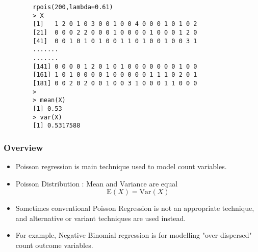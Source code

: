 \documentclass[MASTER.tex]{subfiles}
\begin{document}
\begin{frame}[fragile]
	\begin{framed}
		\begin{verbatim}
		rpois(200,lambda=0.61)
		> X
		[1]   1 2 0 1 0 3 0 0 1 0 0 4 0 0 0 1 0 1 0 2
		[21]  0 0 0 2 2 0 0 0 1 0 0 0 0 1 0 0 0 1 2 0
		[41]  0 0 1 0 1 0 1 0 0 1 1 0 1 0 0 1 0 0 3 1
		.......
		.......
		[141] 0 0 0 0 1 2 0 1 0 1 0 0 0 0 0 0 0 1 0 0
		[161] 1 0 1 0 0 0 0 1 0 0 0 0 0 1 1 1 0 2 0 1
		[181] 0 0 2 0 2 0 0 1 0 0 3 1 0 0 0 1 1 0 0 0
		>
		> mean(X)
		[1] 0.53
		> var(X)
		[1] 0.5317588
		\end{verbatim}
	\end{framed}
\end{frame}
\begin{frame}
\frametitle{Overview}
\Large
\begin{itemize}
\item  Poisson regression is main technique used to model count variables.

\item Poisson Distribution : Mean and Variance are equal
\[ \mathrm{E}(X)  = \mathrm{Var}(X) \]


\item  Sometimes conventional Poisson Regression is not an appropriate technique, and alternative or variant techniques are used instead.


\item  For example, Negative Binomial regression is for modelling "over-dispersed" count outcome variables.
\end{itemize}
\end{frame}
\end{document}
